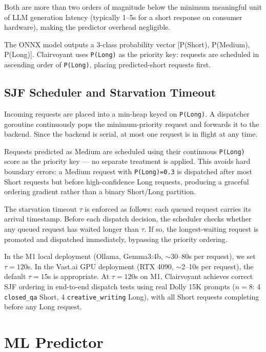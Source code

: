 \documentclass[10pt,letterpaper]{article}
\begin{document}
Both are more than two orders of magnitude below the minimum meaningful unit of LLM generation latency (typically 1--5s for a short response on consumer hardware), making the predictor overhead negligible.

The ONNX model outputs a 3-class probability vector [P(Short), P(Medium), P(Long)]. Clairvoyant uses \texttt{P(Long)} as the priority key: requests are scheduled in ascending order of \texttt{P(Long)}, placing predicted-short requests first.

\subsection{SJF Scheduler and Starvation Timeout}

Incoming requests are placed into a min-heap keyed on \texttt{P(Long)}. A dispatcher goroutine continuously pops the minimum-priority request and forwards it to the backend. Since the backend is serial, at most one request is in flight at any time.

Requests predicted as Medium are scheduled using their continuous \texttt{P(Long)} score as the priority key --- no separate treatment is applied. This avoids hard boundary errors: a Medium request with \texttt{P(Long)=0.3} is dispatched after most Short requests but before high-confidence Long requests, producing a graceful ordering gradient rather than a binary Short/Long partition.

The starvation timeout $\tau$ is enforced as follows: each queued request carries its arrival timestamp. Before each dispatch decision, the scheduler checks whether any queued request has waited longer than $\tau$. If so, the longest-waiting request is promoted and dispatched immediately, bypassing the priority ordering.

In the M1 local deployment (Ollama, Gemma3:4b, ${\sim}$30--80s per request), we set $\tau = 120$s. In the Vast.ai GPU deployment (RTX 4090, ${\sim}$2--10s per request), the default $\tau = 15$s is appropriate. At $\tau = 120$s on M1, Clairvoyant achieves correct SJF ordering in end-to-end dispatch tests using real Dolly 15K prompts ($n=8$: 4 \texttt{closed\_qa} Short, 4 \texttt{creative\_writing} Long), with all Short requests completing before any Long request.

\section{ML Predictor}
\label{sec:predictor}
\end{document}
